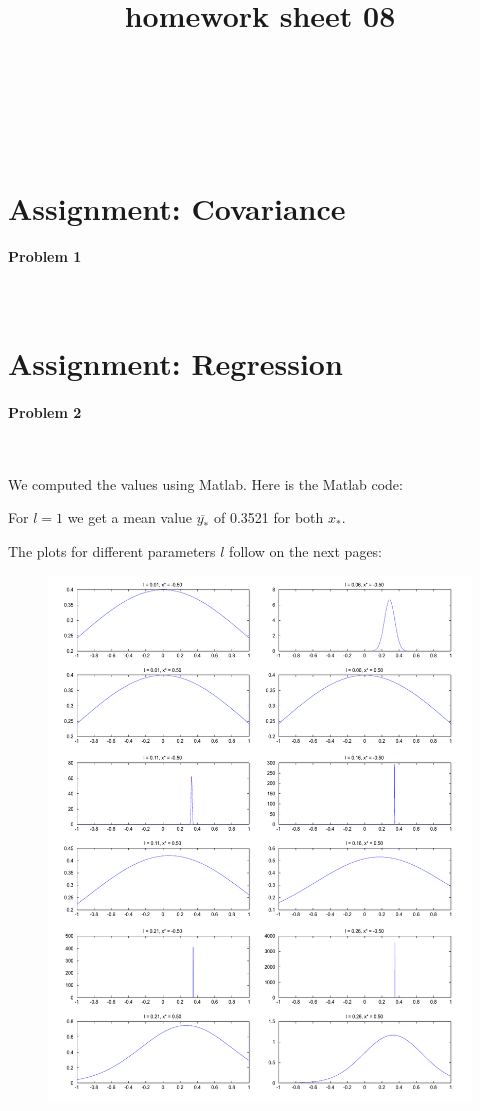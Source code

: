 \documentclass{article}
\title{homework sheet 08}
\author{
\name{Andre Seitz}\\
\imat{03622870}\\
\email{andre.seitz@mytum.de}
\And
\name{Linda Leidig} \\
\imat{03608416}\\
\email{linda.leidig@tum.de}
}
\begin{document}
\maketitle

\section{Assignment: Covariance}
\paragraph*{Problem 1}
$\;$ 


\section{Assignment: Regression}
\paragraph*{Problem 2}
$\;$ 

We computed the values using Matlab. Here is the Matlab code:





For $l=1$ we get a mean value $\overline{y_*}$ of 0.3521 for both $x_*$.

The plots for different parameters $l$ follow on the next pages:

\begin{figure}[]
\centering
\includegraphics[width=\textwidth]{plots/page1.pdf}
\label{fig:mammary_structure}
\end{figure}
\end{document}
